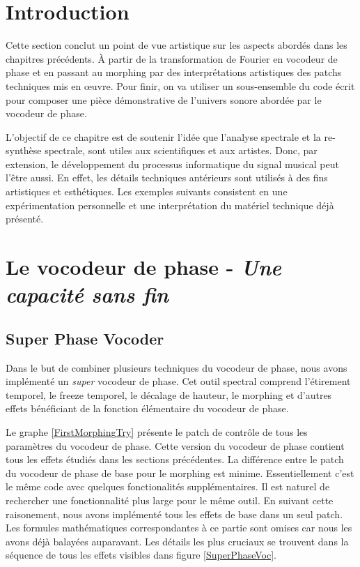 
\label{ch:Implémentations aristiques}

\section{Introduction}

Cette section conclut un point de vue artistique sur les aspects abordés dans les chapitres précédents. À partir de la transformation de Fourier en vocodeur de phase et en passant au morphing par des interprétations artistiques des patchs techniques mis en œuvre. Pour finir, on va utiliser un sous-ensemble du code écrit pour composer une pièce démonstrative de l'univers sonore abordée par le vocodeur de phase.

L'objectif de ce chapitre est de soutenir l'idée que l'analyse spectrale et la re-synthèse spectrale, sont utiles aux scientifiques et aux artistes. Donc, par extension, le développement du processus informatique du signal musical peut l'être aussi. En effet, les détails techniques antérieurs sont utilisés à des fins artistiques et esthétiques. Les exemples suivants consistent en une expérimentation personnelle et une interprétation du matériel technique déjà présenté.

\section{Le vocodeur de phase - \textit{Une capacité sans fin}}

\subsection{Super Phase Vocoder}

Dans le but de combiner plusieurs techniques du vocodeur de phase, nous avons implémenté un \guillemotleft \textit{super} vocodeur de phase\guillemotright . Cet outil spectral comprend l'étirement temporel, le freeze temporel, le décalage de hauteur, le morphing et d'autres effets bénéficiant de la fonction élémentaire du vocodeur de phase.

Le graphe \ref{FirstMorphingTry} présente le patch de contrôle de tous les paramètres du vocodeur de phase. Cette version du vocodeur de phase contient tous les effets étudiés dans les sections précédentes. La différence entre le patch du vocodeur de phase de base pour le morphing est minime. Essentiellement c'est le même code avec quelques fonctionalités supplémentaires. Il est naturel de rechercher une fonctionnalité plus large pour le même outil. En suivant cette raisonement, nous avons implémenté tous les effets de base dans un seul patch. Les formules mathématiques correspondantes à ce partie sont omises car nous les avons déjà balayées auparavant. Les détails les plus cruciaux se trouvent dans la séquence de tous les effets visibles dans figure \ref{SuperPhaseVoc}.

